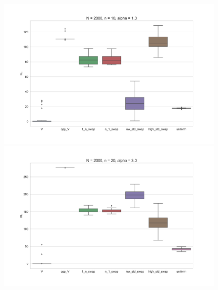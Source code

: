 \documentclass[11pt, oneside]{article}   	%
\begin{document}
\begin{figure}[h!]
		\begin{minipage}[t]{.45\textwidth}
			\centering
			\includegraphics[width=\textwidth]{figures/theorem2_2/N2000n10alpha1.pdf}
			
		\end{minipage}
		\hfill
		\begin{minipage}[t]{.45\textwidth}
			\centering
			\includegraphics[width=\textwidth]{figures/theorem2_2/N2000n20alpha3.pdf}
			
		\end{minipage} 

	
	

\end{figure}
\end{document}
